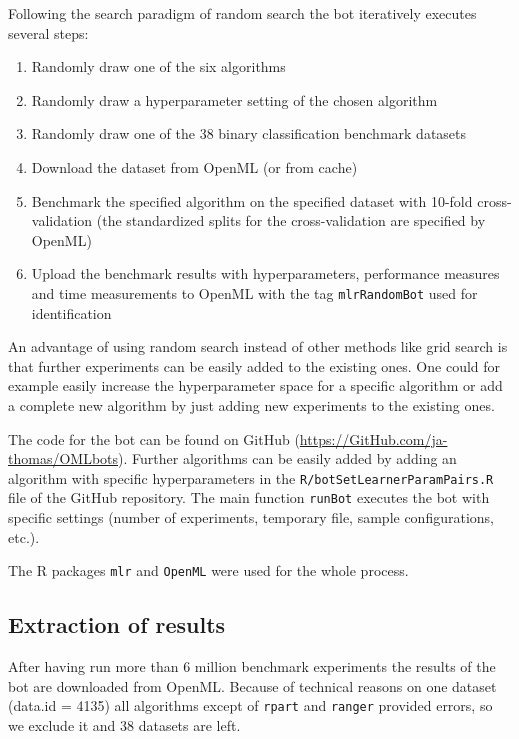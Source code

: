 \documentclass{article}
\begin{document}
Following the search paradigm of random search the bot iteratively executes several steps:
\begin{enumerate}
\item Randomly draw one of the six algorithms
\item Randomly draw a hyperparameter setting of the chosen algorithm
\item Randomly draw one of the 38 binary classification benchmark datasets
\item Download the dataset from OpenML (or from cache)
\item Benchmark the specified algorithm on the specified dataset with 10-fold cross-validation (the standardized splits for the cross-validation are specified by OpenML)
\item Upload the benchmark results with hyperparameters, performance measures and time measurements to OpenML with the tag \texttt{mlrRandomBot} used for identification
\end{enumerate}


An advantage of using random search instead of other methods like grid search is that further experiments can be easily added to the existing ones. One could for example easily increase the hyperparameter space for a specific algorithm or add a complete new algorithm by just adding new experiments to the existing ones. 

The code for the bot can be found on GitHub (\url{https://GitHub.com/ja-thomas/OMLbots}). Further algorithms can be easily added by adding an algorithm with specific hyperparameters in the \texttt{R/botSetLearnerParamPairs.R} file of the GitHub repository. The main function \texttt{runBot} executes the bot with specific settings (number of experiments, temporary file, sample configurations, etc.).

The R packages \texttt{mlr} \citep{Bischl2016} 
and \texttt{OpenML} \citep{Casalicchio2017} were used for the whole process. 


\subsection{Extraction of results}

After having run more than 6 million benchmark experiments the results of the bot are downloaded from OpenML. 
Because of technical reasons on one dataset (data.id = 4135) all algorithms except of \texttt{rpart}
and \texttt{ranger} provided errors, so we exclude it and 38 datasets are left.
\end{document}
